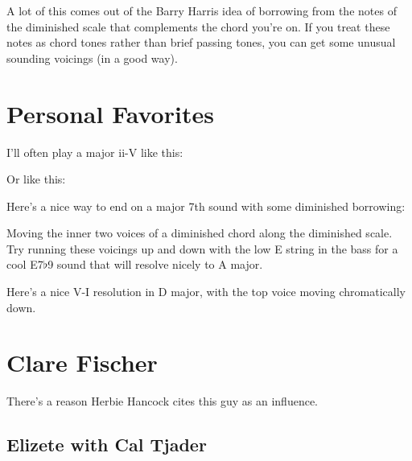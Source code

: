 
A lot of this comes out of the Barry Harris idea of borrowing from the notes of the diminished scale that complements the chord you're on.  If you treat these notes as chord tones rather than brief passing tones, you can get some unusual sounding voicings (in a good way).

\section{Personal Favorites}

I'll often play a major ii-V like this:


Or like this:

\chords{

}

Here's a nice way to end on a major 7th sound with some diminished borrowing:


Moving the inner two voices of a diminished chord along the diminished scale.  Try running these voicings up and down with the low E string in the bass for a cool E7\ensuremath{\flat}9 sound that will resolve nicely to A major.


Here's a nice V-I resolution in D major, with the top voice moving chromatically down.

\section{Clare Fischer}

There's a reason Herbie Hancock cites this guy as an influence.

\subsection{Elizete with Cal Tjader}

